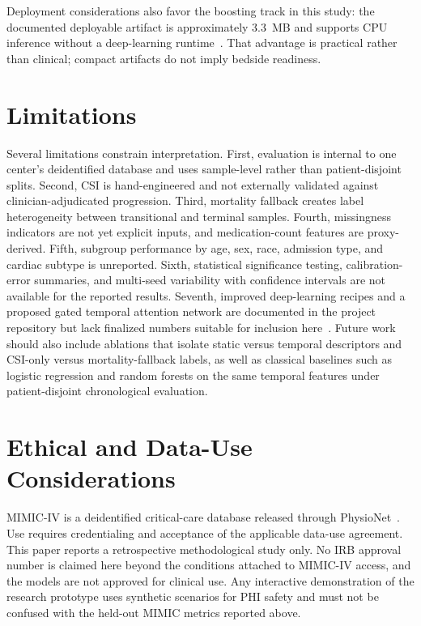 \documentclass[conference]{IEEEtran}
\begin{document}
Deployment considerations also favor the boosting track in this study: the documented deployable artifact is approximately 3.3~MB and supports CPU inference without a deep-learning runtime~\cite{projectrepository}. That advantage is practical rather than clinical; compact artifacts do not imply bedside readiness.

\section{Limitations}
Several limitations constrain interpretation. First, evaluation is internal to one center's deidentified database and uses sample-level rather than patient-disjoint splits. Second, CSI is hand-engineered and not externally validated against clinician-adjudicated progression. Third, mortality fallback creates label heterogeneity between transitional and terminal samples. Fourth, missingness indicators are not yet explicit inputs, and medication-count features are proxy-derived. Fifth, subgroup performance by age, sex, race, admission type, and cardiac subtype is unreported. Sixth, statistical significance testing, calibration-error summaries, and multi-seed variability with confidence intervals are not available for the reported results. Seventh, improved deep-learning recipes and a proposed gated temporal attention network are documented in the project repository but lack finalized numbers suitable for inclusion here~\cite{projectrepository}. Future work should also include ablations that isolate static versus temporal descriptors and CSI-only versus mortality-fallback labels, as well as classical baselines such as logistic regression and random forests on the same temporal features under patient-disjoint chronological evaluation.

\section{Ethical and Data-Use Considerations}
MIMIC-IV is a deidentified critical-care database released through PhysioNet~\cite{johnson2023mimic,johnson2022mimiciv21,goldberger2000physionet}. Use requires credentialing and acceptance of the applicable data-use agreement. This paper reports a retrospective methodological study only. No IRB approval number is claimed here beyond the conditions attached to MIMIC-IV access, and the models are not approved for clinical use. Any interactive demonstration of the research prototype uses synthetic scenarios for PHI safety and must not be confused with the held-out MIMIC metrics reported above.
\end{document}
